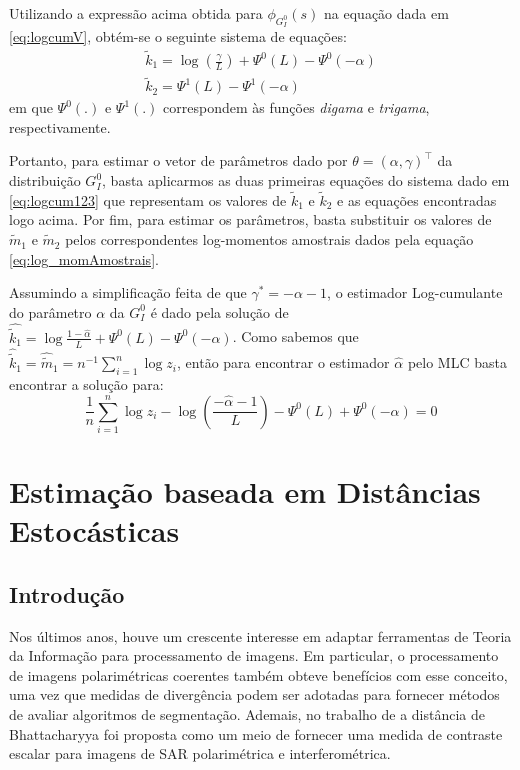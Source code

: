 Utilizando a expressão acima obtida para $\phi_{G_I^0}(s)$ na equação dada em \eqref{eq:logcumV}, obtém-se o seguinte sistema de equações:
\begin{equation}
    \begin{matrix}
        \widetilde{k}_{1} = \log \left ( \frac{\gamma}{L} \right ) + \Psi^{0}(L) - \Psi^{0}(-\alpha)  \\ 
        \widetilde{k}_{2} = \Psi^{1}(L) - \Psi^{1}(-\alpha)
    \end{matrix}
\end{equation}
em que $\Psi^{0}(.)$ e $\Psi^{1}(.)$ correspondem às funções \textit{digama} e \textit{trigama}, respectivamente.

Portanto, para estimar o vetor de parâmetros dado por $\theta = (\alpha, \gamma)^{\top}$ da distribuição $G_I^0$, basta aplicarmos as duas primeiras equações do sistema dado em \eqref{eq:logcum123} que representam os valores de $\widetilde{k}_{1}$ e $\widetilde{k}_{2}$ e as equações encontradas logo acima. Por fim, para estimar os parâmetros, basta substituir os valores de $\widetilde{m}_{1}$ e $\widetilde{m}_{2}$ pelos correspondentes log-momentos amostrais dados pela equação \eqref{eq:log_momAmostrais}. 

Assumindo a simplificação feita de que $\gamma^{*} = -\alpha - 1$, o estimador Log-cumulante do parâmetro $\alpha$ da $G_I^0$ é dado pela solução de $\widehat{\widetilde{k}_{1}} = \log \frac{1-\widehat{\alpha}}{L} + \Psi^{0}(L) - \Psi^{0}(-\alpha)$. Como sabemos que $\widehat{\widetilde{k}}_{1} = \widehat{\widetilde{m}}_{1} = n^{-1}\sum_{i=1}^{n}\log z_i$, então para encontrar o estimador $\widehat{\alpha}$ pelo MLC basta encontrar a solução para:
\begin{equation}
    \frac{1}{n}\sum_{i=1}^{n}\log z_i - \log \left ( \frac{-\widehat{\alpha}-1}{L} \right ) - \Psi^{0}(L) + \Psi^{0}(-\alpha) = 0
    \label{eq:alphaEst_logCum}
\end{equation}

\section{Estimação baseada em Distâncias Estocásticas}

\subsection{Introdução}

Nos últimos anos, houve um crescente interesse em adaptar ferramentas de Teoria da Informação para processamento de imagens. Em particular, o processamento de imagens polarimétricas coerentes também obteve benefícios com esse conceito, uma vez que medidas de divergência podem ser adotadas para fornecer métodos de avaliar algoritmos de segmentação. Ademais, no trabalho de \citet{Goudail:04} a distância de Bhattacharyya foi proposta como um meio de fornecer uma medida de contraste escalar para imagens de SAR polarimétrica e interferométrica.

